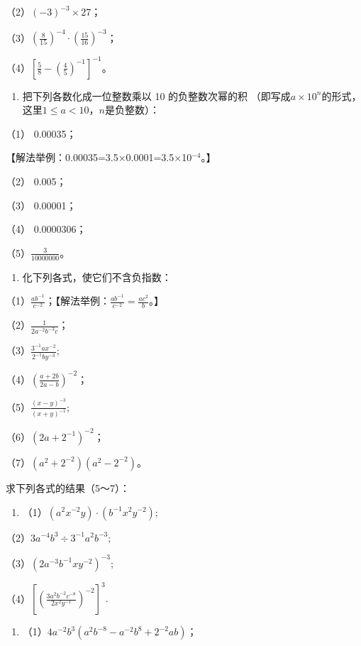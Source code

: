 （2）\((-3)^{-3} \times 27\)；

（3）\(\left(\frac{8}{15}\right)^{-4} \cdot \left(\frac{15}{16}\right)^{-3}\)；

（4）\(\left[\frac{5}{8} - \left(\frac{4}{5}\right)^{-1}\right]^{-1}\)。

\begin{enumerate}[start=3]
\item
  把下列各数化成一位整数乘以 10 的负整数次幂的积
  （即写成\(a \times 10^{n}\)的形式，这里\(1 \leqslant a < 10\)，\(n\)是负整数）：
\end{enumerate}

（1） 0.00035；

【解法举例：0.00035=3.5×0.0001=3.5×10\(^{-4}\)。】

（2） 0.005；

（3） 0.00001；

（4） 0.0000306；

（5）\(\frac{3}{10000000}\)。

\begin{enumerate}[start=4]
\item
  化下列各式，使它们不含负指数：
\end{enumerate}

（1）\(\frac{ab^{-1}}{c^{-2}}\)；【解法举例：\(\frac{ab^{-1}}{c^{-2}} = \frac{ac^2}{b}\)。】

（2）\(\frac{1}{2a^{-2}b^{-3}c}\)；

（3）\(\frac{3^{-1}ax^{-2}}{2^{-1}by^{-3}};\)

（4）\(\left(\frac{a + 2b}{2a - b}\right)^{-2}\)；

（5）\(\frac{(x - y)^{-3}}{(x + y)^{-1}};\)

（6）\((2a + 2^{-1})^{-2}\)；

（7）\((a^2 + 2^{-2})(a^2 - 2^{-2})\)。

求下列各式的结果（5～7）：

\begin{enumerate}[start=5]
\item
  （1）\((a^2 x^{-2}y)\cdot (b^{-1}x^2 y^{-2});\)
\end{enumerate}

（2）\(3a^{-4}b^{3}\div 3^{-1}a^{2}b^{-3};\)

（3）\((2a^{-3}b^{-1}xy^{-2})^{-3};\)

（4）\(\left[\left(\frac{3a^2b^{-2}c^{-8}}{2x^2y^{-1}}\right)^{-2}\right]^3.\)

\begin{enumerate}[start=6]
\item
  （1）\(4a^{-2}b^{3}(a^{2}b^{-8} - a^{-2}b^{8} + 2^{-2}ab)\)；
\end{enumerate}

